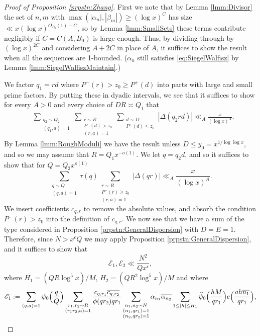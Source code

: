 \documentclass[10pt]{amsart}
\theoremstyle{plain}
\numberwithin{equation}{section}
\renewcommand{\hat}[1]{\widehat #1}
\begin{document}
\begin{proof}[Proof of Proposition \ref{prpstn:Zhang}]
First we note that by Lemma \ref{lmm:Divisor} the set of $n,m$ with $\max(|\alpha_n|,|\beta_m|)\ge(\log{x})^C$ has size $\ll x(\log{x})^{O_{B_0}(1)-C}$, so by Lemma \ref{lmm:SmallSets} these terms contribute negligibly if $C=C(A,B_0)$ is large enough. Thus, by dividing through by $(\log{x})^{2C}$ and considering $A+2C$ in place of $A$, it suffices to show the result when all the sequences are 1-bounded. ($\alpha_n$ still satisfies \eqref{eq:SiegelWalfisz} by Lemma \ref{lmm:SiegelWalfiszMaintain}.)

We factor $q_1=r d$ where $P^-(r)>z_0\ge P^+(d)$ into parts with large and small prime factors. By putting these in dyadic intervals, we see that it suffices to show for every $A>0$ and every choice of $D R\asymp Q_1$ that
 \begin{align*}
 &\sum_{\substack{q_2\sim Q_2\\ (q_1,a)=1}}\sum_{\substack{r\sim R\\ P^-(d)>z_0\\ (r,a)=1}}\sum_{\substack{d\sim D\\ P^+(d)\le z_0}}|\Delta(q_2 r d)|\ll_{A}\frac{x}{(\log{x})^A}.
 \end{align*}
By Lemma \ref{lmm:RoughModuli} we have the result unless $D\le y_0=x^{1/\log\log{x}}$, and so we may assume that $R=Q_1 x^{-o(1)}$. We let $q=q_2 d$, and so it suffices to show that for $Q=Q_2 x^{o(1)}$
\[
\sum_{\substack{q\sim Q\\ (q,a)=1}}\tau(q)\sum_{\substack{r\sim R\\ P^-(r)\ge z_0\\ (r,a)=1}}|\Delta(q r)|\ll_A\frac{x}{(\log{x})^A}.
\]
We insert coefficients $c_{q,r}$ to remove the absolute values, and absorb the condition $P^-(r)>z_0$ into the definition of $c_{q,r}$. We now see that we have a sum of the type considered in Proposition \ref{prpstn:GeneralDispersion} with $D=E=1$. Therefore, since $N>x^\epsilon Q$ we may apply Proposition \ref{prpstn:GeneralDispersion}, and it suffices to show that
\[
\mathscr{E}_1,\mathscr{E}_2\ll \frac{N^2}{Q x^\epsilon},
\]
where $H_1=(QR\log^5{x})/M$, $H_2=(QR^2\log^5{x})/M$ and where
\begin{align*}
\mathscr{E}_{1}&:=\sum_{\substack{ (q,a)=1}}\psi_0\Bigl(\frac{q}{Q}\Bigr)\sum_{\substack{r_1,r_2\sim R\\ (r_1 r_2,a)=1}}\frac{c_{q,r_1}\overline{c_{q,r_2}}}{\phi(q r_2)q r_1}\sum_{\substack{n_1,n_2\sim N\\ (n_1,q r_1)=1\\(n_2,q r_2)=1}}\alpha_{n_1}\overline{\alpha_{n_2}}\sum_{1\le |h|\le H_1}\hat{\psi}_0\Bigl(\frac{h M}{q r_1}\Bigr)e\Bigl( \frac{a h \overline{ n_1}}{q r_1}\Bigr),\\

\end{align*}
\end{proof}
\end{document}
